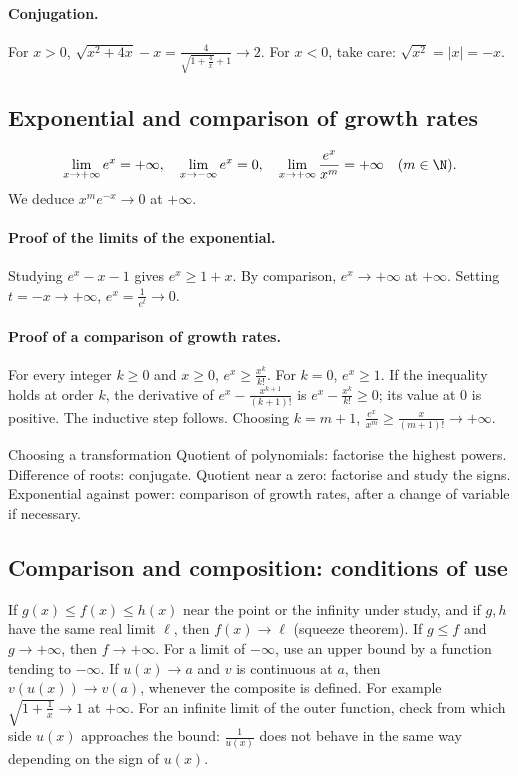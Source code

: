\paragraph{Conjugation.} For $x>0$, $\sqrt{x^2+4x}-x=\frac{4}{\sqrt{1+\frac{4}{x}}+1}\to2$. For $x<0$, take care: $\sqrt{x^2}=|x|=-x$.
\subsection{Exponential and comparison of growth rates}
\[\lim_{x\to+\infty}e^x=+\infty,\quad\lim_{x\to-\infty}e^x=0,\quad
\lim_{x\to+\infty}\frac{e^x}{x^m}=+\infty\quad(m\in\N).\]
We deduce $x^me^{-x}\to0$ at $+\infty$.
\paragraph{Proof of the limits of the exponential.} Studying $e^x-x-1$ gives $e^x\ge1+x$. By comparison, $e^x\to+\infty$ at $+\infty$. Setting $t=-x\to+\infty$, $e^x=\frac{1}{e^t}\to0$.
\paragraph{Proof of a comparison of growth rates.} For every integer $k\ge0$ and $x\ge0$, $e^x\ge \frac{x^k}{k!}$. For $k=0$, $e^x\ge1$. If the inequality holds at order $k$, the derivative of $e^x-\frac{x^{k+1}}{(k+1)!}$ is $e^x-\frac{x^k}{k!}\ge0$; its value at $0$ is positive. The inductive step follows. Choosing $k=m+1$, $\frac{e^x}{x^m}\ge \frac{x}{(m+1)!}\to+\infty$.
\begin{methode}{Choosing a transformation}
Quotient of polynomials: factorise the highest powers. Difference of roots: conjugate. Quotient near a zero: factorise and study the signs. Exponential against power: comparison of growth rates, after a change of variable if necessary.
\end{methode}
\subsection{Comparison and composition: conditions of use}
If $g(x)\le f(x)\le h(x)$ near the point or the infinity under study, and if $g,h$ have the same real limit $\ell$, then $f(x)\to\ell$ (squeeze theorem). If $g\le f$ and $g\to+\infty$, then $f\to+\infty$. For a limit of $-\infty$, use an upper bound by a function tending to $-\infty$.
If $u(x)\to a$ and $v$ is continuous at $a$, then $v(u(x))\to v(a)$, whenever the composite is defined. For example $\sqrt{1+\frac{1}{x}}\to1$ at $+\infty$. For an infinite limit of the outer function, check from which side $u(x)$ approaches the bound: $\frac{1}{u(x)}$ does not behave in the same way depending on the sign of $u(x)$.


